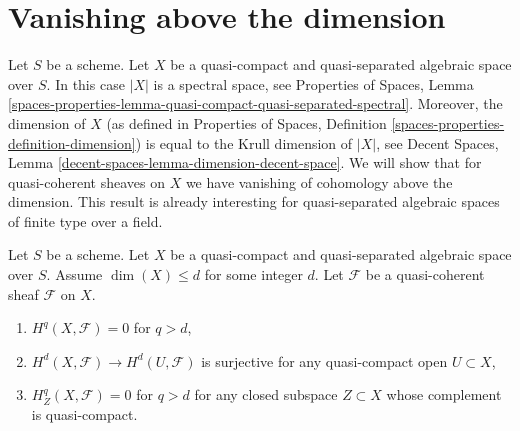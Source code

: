 \section{Vanishing above the dimension}
\label{section-vanishing-above-dimension}

\noindent
Let $S$ be a scheme. Let $X$ be a quasi-compact and quasi-separated
algebraic space over $S$. In this case $|X|$ is a spectral space, see
Properties of Spaces, Lemma
\ref{spaces-properties-lemma-quasi-compact-quasi-separated-spectral}.
Moreover, the dimension of $X$ (as defined in
Properties of Spaces, Definition \ref{spaces-properties-definition-dimension})
is equal to the Krull dimension of $|X|$, see
Decent Spaces, Lemma \ref{decent-spaces-lemma-dimension-decent-space}.
We will show that for quasi-coherent sheaves on $X$ we have vanishing of
cohomology above the dimension. This result is already interesting for
quasi-separated algebraic spaces of finite type over a field.

\begin{lemma}
\label{lemma-vanishing-above-dimension}
Let $S$ be a scheme. Let $X$ be a quasi-compact and quasi-separated
algebraic space over $S$. Assume $\dim(X) \leq d$ for some integer $d$.
Let $\mathcal{F}$ be a quasi-coherent sheaf $\mathcal{F}$ on $X$.
\begin{enumerate}
\item $H^q(X, \mathcal{F}) = 0$ for $q > d$,
\item $H^d(X, \mathcal{F}) \to H^d(U, \mathcal{F})$ is surjective
for any quasi-compact open $U \subset X$,
\item $H^q_Z(X, \mathcal{F}) = 0$ for $q > d$ for any closed subspace
$Z \subset X$ whose complement is quasi-compact.
\end{enumerate}
\end{lemma}

